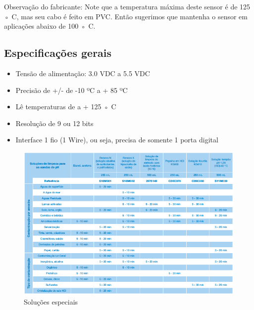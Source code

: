 Observação do fabricante: Note que a temperatura máxima deste sensor é de 125 ◦ C, mas seu cabo é feito em PVC. Então sugerimos que mantenha o sensor em aplicações abaixo de 100 ◦ C.

\subsection{Especificações gerais}

\begin{itemize}
	\item Tensão de alimentação: 3.0 VDC a 5.5 VDC
	\item Precisão de +/- de -10 ºC a + 85 ºC
	\item Lê temperaturas de a + 125 ◦ C
	\item Resolução de 9 ou 12 bits
	\item Interface 1 fio (1 Wire), ou seja, precisa de somente 1 porta digital
\end{itemize}

\begin{figure}[H]
	\centering
	\includegraphics[width=16cm]{figuras/solucoes_especiais.png}
	\caption{Soluções especiais}
	\label{solucoes_especiais}
\end{figure}

